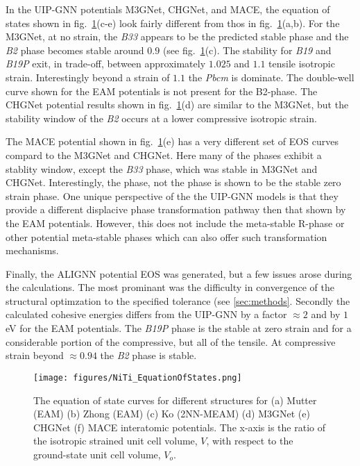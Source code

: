 \documentclass[preprint,colorlinks=true,linkcolor=black,citecolor=black]{elsarticle}
\begin{document}
In the UIP-GNN potentials M3GNet, CHGNet, and MACE, the equation of
states shown in fig.~\ref{fig:eos}(c-e) look fairly different from
thos in fig.~\ref{fig:eos}(a,b). For the M3GNet, at no strain, the
\textit{B33} appears to be the predicted stable phase and the
\textit{B2} phase becomes stable around $0.9$ (see
fig.~\ref{fig:eos}(c). The stability for \textit{B19} and
\textit{B19P} exit, in trade-off, between approximately $1.025$ and
$1.1$ tensile isotropic strain. Interestingly beyond a strain of $1.1$
the \textit{Pbcm} is dominate. The double-well curve shown for the EAM
potentials is not present for the B2-phase. The CHGNet potential
results shown in fig.~\ref{fig:eos}(d) are similar to the M3GNet, but
the stability window of the \textit{B2} occurs at a lower compressive
isotropic strain. \par

The MACE potential shown in fig.~\ref{fig:eos}(e) has a very different
set of EOS curves compard to the M3GNet and CHGNet. Here many of the
phases exhibit a stablity window, except the \textit{B33} phase, which
was stable in M3GNet and CHGNet. Interestingly, the  phase,
not the  phase is shown to be the stable zero strain
phase. One unique perspective of the the UIP-GNN models is that they
provide a different displacive phase transformation pathway then that
shown by the EAM potentials. However, this does not include the
meta-stable R-phase or other potential meta-stable phases which can
also offer such transformation mechanisms. \par

Finally, the ALIGNN potential EOS was generated, but a few issues
arose during the calculations. The most prominant was the difficulty
in convergence of the structural optimzation to the specified
tolerance (see \ref{sec:methods}. Secondly the calculated cohesive
energies differs from the UIP-GNN by a factor $\approx 2$ and by $1$
eV for the EAM potentials. The \textit{B19P} phase is the stable at
zero strain and for a considerable portion of the compressive, but all
of the tensile. At compressive strain beyond $\approx 0.94$ the
\textit{B2} phase is stable.

\begin{figure}[ht!]
	\begin{centering}
		\texttt{[image: figures/NiTi\_EquationOfStates.png]}
		\caption{ The equation of state curves for different 
			structures for (a) Mutter (EAM) (b) Zhong (EAM) (c) Ko
			(2NN-MEAM) (d) M3GNet (e) CHGNet (f) MACE interatomic
			potentials. The x-axis is the ratio of the isotropic strained
			unit cell volume, $V$, with respect to the ground-state unit
			cell volume, $V_o$.  }
		\label{fig:eos}
	\end{centering}
\end{figure}
\end{document}

